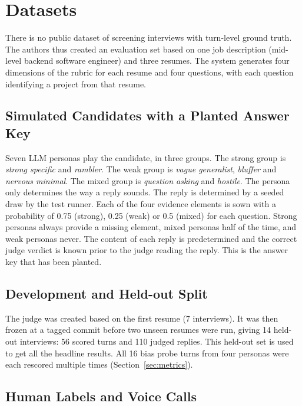 \documentclass[conference]{IEEEtran}
\begin{document}
\section{Datasets}\label{sec:data}

There is no public dataset of screening interviews with turn-level ground truth. The authors thus created an evaluation set based on one job description (mid-level backend software engineer) and three resumes. The system generates four dimensions of the rubric for each resume and four questions, with each question identifying a project from that resume.

\subsection{Simulated Candidates with a Planted Answer Key}

Seven LLM personas play the candidate, in three groups. The strong group is \textit{strong specific} and \textit{rambler}. The weak group is \textit{vague generalist}, \textit{bluffer} and \textit{nervous minimal}. The mixed group is \textit{question asking} and \textit{hostile}. The persona only determines the way a reply sounds. The reply is determined by a seeded draw by the test runner. Each of the four evidence elements is sown with a probability of 0.75 (strong), 0.25 (weak) or 0.5 (mixed) for each question. Strong personas always provide a missing element, mixed personas half of the time, and weak personas never. The content of each reply is predetermined and the correct judge verdict is known prior to the judge reading the reply. This is the answer key that has been planted.

\subsection{Development and Held-out Split}

The judge was created based on the first resume (7 interviews). It was then frozen at a tagged commit before two unseen resumes were run, giving 14 held-out interviews: 56 scored turns and 110 judged replies. This held-out set is used to get all the headline results. All 16 bias probe turns from four personas were each rescored multiple times (Section~\ref{sec:metrics}).

\subsection{Human Labels and Voice Calls}
\end{document}
